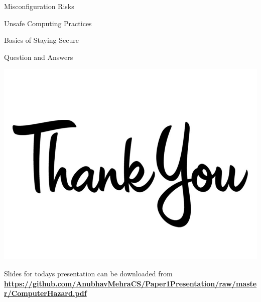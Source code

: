 \documentclass{beamer}
\begin{document}
\begin{frame}{Misconfiguration Risks}
	
\end{frame}
\begin{frame}{Unsafe Computing Practices}
\end{frame}
\begin{frame}{Basics of Staying Secure}
\end{frame}
\begin{frame}{Question and Answers}
	\begin{center}
		\includegraphics[scale=0.2]{thank.jpg}
	\end{center}
	\large Slides for todays presentation can be downloaded from 
	\tiny \textbf{\underline{https://github.com/AnubhavMehraCS/Paper1Presentation/raw/master/ComputerHazard.pdf}}
\end{frame}
\end{document}
